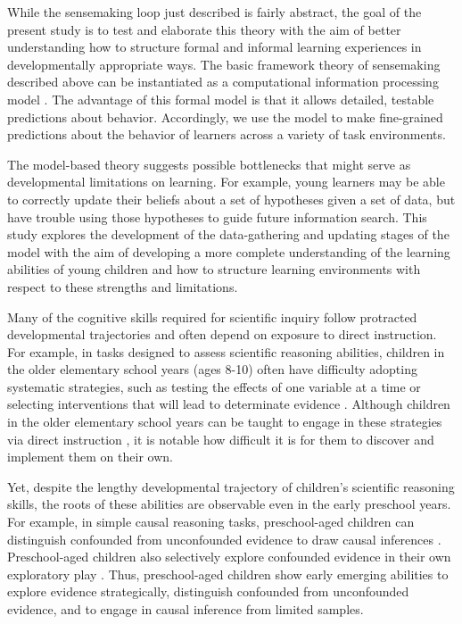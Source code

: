 \documentclass[10pt,letterpaper]{article}
\begin{document}
While the sensemaking loop just described is fairly abstract, the goal of the present study is to test and elaborate this theory with the aim of better understanding how to structure formal and informal learning experiences in developmentally appropriate ways. The basic framework theory of sensemaking described above can be instantiated as a computational information processing model \cite{Gureckis:2012,Gureckis:2009,Markant:2012}. The advantage of this formal model is that it allows detailed, testable predictions about behavior. Accordingly, we use the model to make fine-grained predictions about the behavior of learners across a variety of task environments.

The model-based theory suggests possible bottlenecks that might serve as developmental limitations on learning. For example, young learners may be able to correctly update their beliefs about a set of hypotheses given a set of data, but have trouble using those hypotheses to guide future information search. This study explores the development of the data-gathering and updating stages of the model with the aim of developing a more complete understanding of the learning abilities of young children and how to structure learning environments with respect to these strengths and limitations.

Many of the cognitive skills required for scientific inquiry follow protracted developmental trajectories and often depend on exposure to direct instruction. For example, in tasks designed to assess scientific reasoning abilities, children in the older elementary school years (ages 8-10) often have difficulty adopting systematic strategies, such as testing the effects of one variable at a time or selecting interventions that will lead to determinate evidence \cite{Chen:1999}. Although children in the older elementary school years can be taught to engage in these strategies via direct instruction \cite{Klahr:2004,Kuhn:2005}, it is notable how difficult it is for them to discover and implement them on their own.

Yet, despite the lengthy developmental trajectory of children's scientific reasoning skills, the roots of these abilities are observable even in the early preschool years. For example, in simple causal reasoning tasks, preschool-aged children can distinguish confounded from unconfounded evidence to draw causal inferences \cite{Gopnik:2001,Kushnir:2005,Kushnir:2007,Schulz:2004}. Preschool-aged children also selectively explore confounded evidence in their own exploratory play \cite{Cook:2011,Gweon:2008,Schulz:2007}. Thus, preschool-aged children show early emerging abilities to explore evidence strategically, distinguish confounded from unconfounded evidence, and to engage in causal inference from limited samples.
\end{document}
